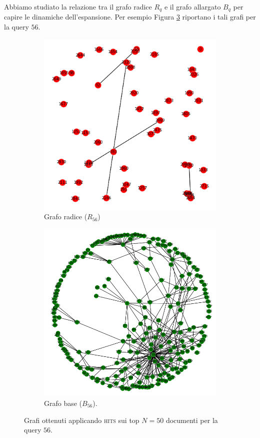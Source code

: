 \documentclass[12pt]{article}
\begin{document}
Abbiamo studiato la relazione tra il grafo radice $R_q$ e il grafo allargato $B_q$ per capire le dinamiche dell'espansione. Per esempio Figura \ref{fig:unodue} riportano i tali grafi per la query $56$.
\begin{figure}
	\centering
	\begin{subfigure}{.5\textwidth}
		\centering
		\includegraphics[width=1\textwidth]{../R.png}
		\caption{Grafo radice ($R_{56}$)}
		\label{fig:uno}
	\end{subfigure}%
	\begin{subfigure}{.5\textwidth}
		\centering
		\includegraphics[width=1\textwidth]{../B.png}
		\caption{Grafo base ($B_{56}$).}
		\label{fig:due}
	\end{subfigure}
	\caption{Grafi ottenuti applicando \textsc{hits} sui top $N=50$ documenti per la query $56$.}
	\label{fig:unodue}
\end{figure}
\end{document}
